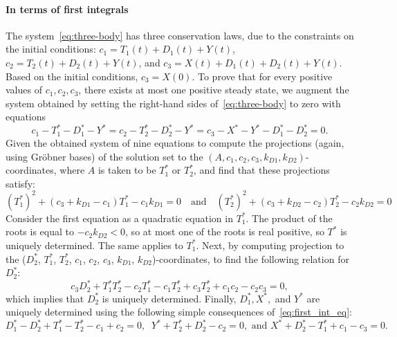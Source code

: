 \paragraph{In terms of first integrals}
The system~\eqref{eq:three-body} has three conservation laws, due to the constraints on the initial conditions: $c_1=T_1(t) + D_1(t) + Y(t)$, $c_2 = T_2(t) + D_2(t) + Y(t)$, and $c_3 = X(t) + D_1(t) + D_2(t) + Y(t)$.
Based on the initial conditions, $c_3 = X(0)$.
To prove that for every positive values of $c_1, c_2, c_3$, there exists at most one positive steady state, we augment the system obtained by setting the right-hand sides of~\eqref{eq:three-body} to zero with equations 
\begin{equation}\label{eq:first_int_eq}
	c_1 - T_1^* - D_1^* - Y^* = c_2 - T_2^* - D_2^* - Y^* = c_3 - X^* - Y^* - D_1^* - D_2^* = 0.
\end{equation}
Given the obtained system of nine equations to compute the projections (again, using Gr\"obner bases) of the solution set to the $(A, c_1, c_2, c_3, k_{D1}, k_{D2})$-coordinates, where $A$ is taken to be $T_1^*$ or $T_2^*$, and find that these projections satisfy:
\begin{equation}\label{eq:via1int1}
	(T_1^*)^2 + (c_3 + k_{D1} - c_1)T_1^* - c_1 k_{D1} = 0 \quad \text{and}\quad(T_2^*)^2 + (c_3 + k_{D2} - c_2)T_2^* - c_2 k_{D2} = 0
\end{equation}
Consider the first equation as a quadratic equation in $T_1^*$. 
The product of the roots is equal to $-c_2k_{D2} < 0$, so at most one of the roots is real positive, so $T^*$ is uniquely determined.
The same applies to $T_1^*$.
Next, by computing projection to the ($D_2^*$, $T_1^*$, $T_2^*$, $c_1$, $c_2$, $c_3$, $k_{D1}$, $k_{D2}$)-coordinates, to find the following relation for $D_2^*$:
\begin{equation}\label{eq:via1int2}
	c_3 D_2^* + T_1^* T_2^* - c_2 T_1^* - c_1 T_2^* + c_3 T_2^* + c_1 c_2 - c_2 c_3 = 0,
\end{equation}
which implies that $D_2^*$ is uniquely determined.
Finally, $D_1^*, X^*,$ and $Y^*$ are uniquely determined using the following simple consequences of~\eqref{eq:first_int_eq}:
\begin{equation}\label{eq:via1int3}
	D_1^* - D_2^* + T_1^* - T_2^* - c_1 + c_2 = 0, \;\; Y^* + T_2^* + D_2^* - c_2 = 0,\text{ and } X^* + D_2^* - T_1^* + c_1 - c_3 = 0.
\end{equation}


